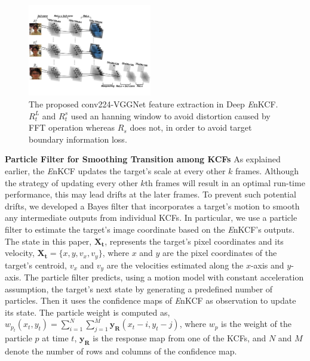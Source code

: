 \documentclass[10pt,twocolumn,letterpaper]{article}
\begin{document}
\begin{figure}[!h]
\centering
\includegraphics[width=0.48\textwidth]{./figures/Filters_Details_CNN.pdf}
\caption{The proposed conv224-VGGNet feature extraction in Deep{\it
    E}nKCF. $R_{t}^{L}$ and $R_{t}^{s}$ used an hanning window to
  avoid distortion caused by FFT operation whereas $R_{s}$ does not,
  in order to avoid target boundary information loss.}
\label{fig:Filters_CNN}
\end{figure}

\textbf{Particle Filter for Smoothing Transition among KCFs} As
explained earlier, the {\it E}nKCF updates the target's scale at every
other $k$ frames. Although the strategy of updating every other $k$th
frames will result in an optimal run-time performance, this may lead
drifts at the later frames. To prevent such potential drifts, we
developed a Bayes filter that incorporates a target's motion to smooth
any intermediate outputs from individual KCFs. In particular, we use a
particle filter to estimate the target's image coordinate based on the
{\it E}nKCF's outputs. The state in this paper, $\boldsymbol{X_{t}}$,
represents the target's pixel coordinates and its velocity,
$\boldsymbol{X_{t}} = \lbrace x, y, v_{x}, v_{y} \rbrace$, where $x$
and $y$ are the pixel coordinates of the target's centroid, $v_x$ and
$v_y$ are the velocities estimated along the $x$-axis and
$y$-axis. The particle filter predicts, using a motion model with
constant acceleration assumption, the target's next state by
generating a predefined number of particles. Then it uses the
confidence maps of {\it E}nKCF as observation to update its state. The
particle weight is computed as, $w_{p_{t}}(x_{t},y_{t}) =
\sum_{i=1}^{N}\sum_{j=1}^{M} \boldsymbol{y_{R}}(x_{t}-i,y_{t}-j)$,
where $w_{p}$ is the weight of the particle $p$ at time $t$,
$\boldsymbol{y_{R}}$ is the response map from one of the KCFs, and $N$
and $M$ denote the number of rows and columns of the confidence map.
        
\end{document}
